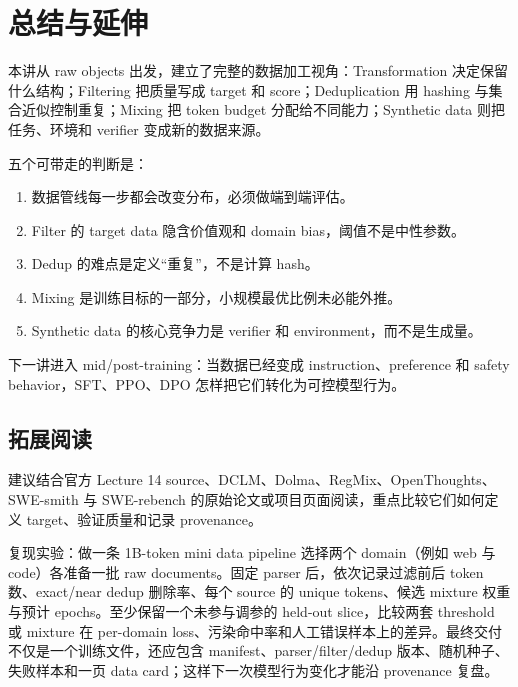 \section{总结与延伸}

本讲从 raw objects 出发，建立了完整的数据加工视角：Transformation 决定保留什么结构；Filtering 把质量写成 target 和 score；Deduplication 用 hashing 与集合近似控制重复；Mixing 把 token budget 分配给不同能力；Synthetic data 则把任务、环境和 verifier 变成新的数据来源。

五个可带走的判断是：

\begin{enumerate}
\item 数据管线每一步都会改变分布，必须做端到端评估。
\item Filter 的 target data 隐含价值观和 domain bias，阈值不是中性参数。
\item Dedup 的难点是定义“重复”，不是计算 hash。
\item Mixing 是训练目标的一部分，小规模最优比例未必能外推。
\item Synthetic data 的核心竞争力是 verifier 和 environment，而不是生成量。
\end{enumerate}

下一讲进入 mid/post-training：当数据已经变成 instruction、preference 和 safety behavior，SFT、PPO、DPO 怎样把它们转化为可控模型行为。

\subsection{拓展阅读}

建议结合官方 Lecture 14 source、DCLM、Dolma、RegMix、OpenThoughts、SWE-smith 与 SWE-rebench 的原始论文或项目页面阅读，重点比较它们如何定义 target、验证质量和记录 provenance。

\begin{knowledgebox}{复现实验：做一条 1B-token mini data pipeline}
选择两个 domain（例如 web 与 code）各准备一批 raw documents。固定 parser 后，依次记录过滤前后 token 数、exact/near dedup 删除率、每个 source 的 unique tokens、候选 mixture 权重与预计 epochs。至少保留一个未参与调参的 held-out slice，比较两套 threshold 或 mixture 在 per-domain loss、污染命中率和人工错误样本上的差异。最终交付不仅是一个训练文件，还应包含 manifest、parser/filter/dedup 版本、随机种子、失败样本和一页 data card；这样下一次模型行为变化才能沿 provenance 复盘。
\end{knowledgebox}


